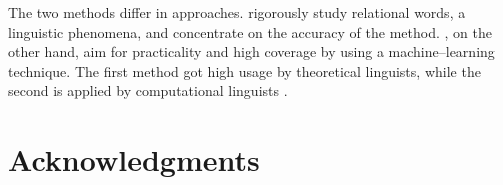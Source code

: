 \documentclass[11pt]{article}
\begin{document}
The two methods differ in approaches. \cite{grefenstette2011experimental}
rigorously study relational words, a linguistic phenomena, and concentrate on
the accuracy of the method. \cite{socher2012semantic}, on the other hand, aim
for practicality and high coverage by using a machine--learning technique. The
first method got high usage by theoretical linguists, while the second is
applied by computational linguists \cite{steedman2011romantics}.


\section*{Acknowledgments}




\end{document}
